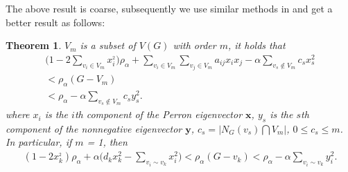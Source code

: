 \documentclass[amsthm]{elsart}
\newtheorem{theorem}{Theorem}[section]
\begin{document}
The above result is coarse, subsequently we use similar methods in \cite{2012Bounds} and get a better result as follows:
\begin{theorem} \label{the:1}
$V_m$ is a subset of $V(G)$ with order $m$, it holds that
\begin{eqnarray} \label{equ:1}
\nonumber \big(1 - 2\sum \limits_{v_i \in V_m}^{} x_i^{_2} \big) \rho_\alpha
+ \sum \limits_{v_i \in V_m}^{} \sum \limits_{v_j \in V_m}^{} a_{ij}x_ix_j
- \alpha \sum \limits_{v_s \notin V_m}^{} c_s x_s^2
\\ \nonumber < \rho_\alpha(G - V_m) \qquad \;\,
\\  <  \rho_\alpha - \alpha \sum \limits_{v_s \notin V_m}^{} c_s y_s^2.
\end{eqnarray}
where $x_i$ is the $i$th component of the Perron eigenvector $\textbf{x}$, $y_s$ is the $s$th component of the nonnegative eigenvector $\textbf{y}$, $ c_s = |N_G(v_s) \bigcap V_m|$, $0\leqslant c_s \leqslant m$.
\\ In particular, if $m$ = 1, then
\begin{eqnarray} \label{equ:2}
(1 - 2x_k^{_2})\rho_\alpha
+ \alpha \big(d_k x_k^2 - \sum \limits_{v_i \sim v_k}^{} x_i^2 \big)
< \rho_\alpha(G - v_k)
<  \rho_\alpha - \alpha \sum \limits_{v_i \sim v_k}^{} y_i^2.
\end{eqnarray}
\end{theorem}
\end{document}
